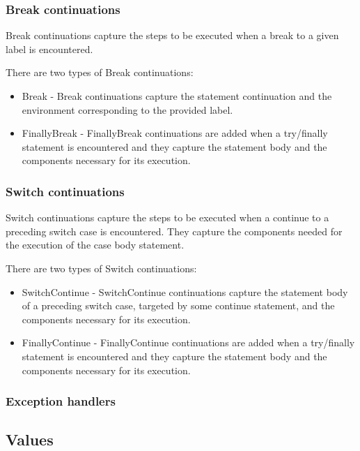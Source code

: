 \documentclass{article}
\begin{document}
\subsubsection{Break continuations}
\label{subsubsec:break-continuations}

Break continuations capture the steps to be executed when a break to a given label is encountered.

\noindent
There are two types of Break continuations:
\begin{itemize}
\item Break -
Break continuations capture the statement continuation and the environment corresponding to the provided label.
\item FinallyBreak -
FinallyBreak continuations are added when a try/finally statement is encountered and they capture the statement body and the components necessary for its execution.
\end{itemize}

\subsubsection{Switch continuations}
\label{subsubsec:switch-continuations}

Switch continuations capture the steps to be executed when a continue to a preceding switch case is encountered. They capture the components needed for the execution of the case body statement.

\noindent
There are two types of Switch continuations:
\begin{itemize}
\item SwitchContinue -
SwitchContinue continuations capture the statement body of a preceding switch case, targeted by some continue statement, and the components necessary for its execution.
\item FinallyContinue -
FinallyContinue continuations are added when a try/finally statement is encountered and they capture the statement body and the components necessary for its execution.
\end{itemize}
\subsubsection{Exception handlers}
\label{subsubsec:exception-handlers}

\subsection{Values}
\label{subsec:values}
\end{document}
